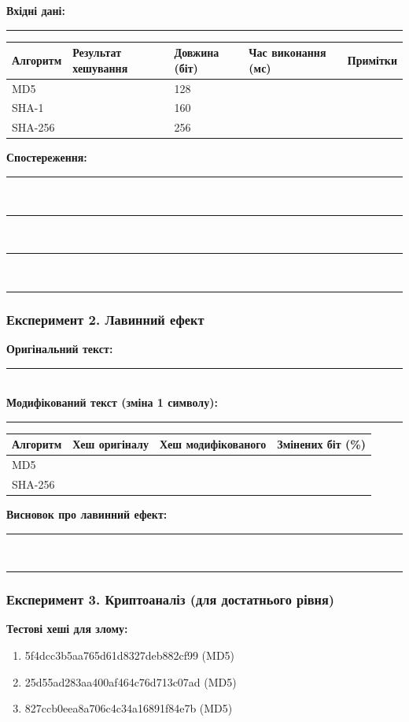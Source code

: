 \noindent
\textbf{Вхідні дані:} \rule{10cm}{0.5pt}

\begin{table}[h]
\centering
\begin{tabular}{|l|p{5cm}|p{2cm}|p{1.5cm}|p{2.5cm}|}
\hline
\textbf{Алгоритм} & \textbf{Результат хешування} & \textbf{Довжина (біт)} & \textbf{Час виконання (мс)} & \textbf{Примітки} \\
\hline
MD5 & & 128 & & \\
\hline
SHA-1 & & 160 & & \\
\hline
SHA-256 & & 256 & & \\
\hline
\end{tabular}
\end{table}

\noindent
\textbf{Спостереження:} \rule{12cm}{0.5pt}\\
\rule{16cm}{0.5pt}\\
\rule{16cm}{0.5pt}\\
\rule{16cm}{0.5pt}

\subsubsection*{Експеримент 2. Лавинний ефект}

\noindent
\textbf{Оригінальний текст:} \rule{6cm}{0.5pt}\\
\textbf{Модифікований текст (зміна 1 символу):} \rule{6cm}{0.5pt}

\begin{table}[h]
\centering
\begin{tabular}{|l|p{3cm}|p{3cm}|c|}
\hline
\textbf{Алгоритм} & \textbf{Хеш оригіналу} & \textbf{Хеш модифікованого} & \textbf{Змінених біт (\%)} \\
\hline
MD5 & & & \\
\hline
SHA-256 & & & \\
\hline
\end{tabular}
\end{table}

\noindent
\textbf{Висновок про лавинний ефект:} \rule{10cm}{0.5pt}\\
\rule{15cm}{0.5pt}

\subsubsection*{Експеримент 3. Криптоаналіз (для достатнього рівня)}

\textbf{Тестові хеші для злому:}
\begin{enumerate}
    \item 5f4dcc3b5aa765d61d8327deb882cf99 (MD5)
    \item 25d55ad283aa400af464c76d713c07ad (MD5)
    \item 827ccb0eea8a706c4c34a16891f84e7b (MD5)
\end{enumerate}

